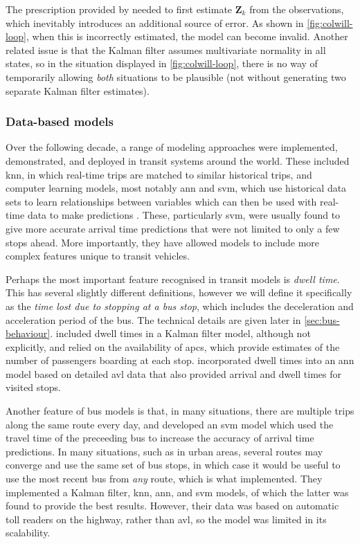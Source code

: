 \documentclass[12pt,a4paper]{article}
\newcommand{\mat}[1]{\mathbf{#1}}
\newcommand{\kf}{Kalman filter}
\begin{document}
The prescription provided by \cite{cathey-dailey:2003} needed to first
estimate $\mat{Z}_k$ from the observations,
which inevitably introduces an additional source of error.
As shown in \cref{fig:colwill-loop}, when this is incorrectly estimated,
the model can become invalid.
Another related issue is that the \kf{} assumes multivariate normality
in all states, so in the situation displayed in \cref{fig:colwill-loop},
there is no way of temporarily allowing \emph{both} situations to be plausible
(not without generating two separate \kf{} estimates).



\subsubsection{Data-based models}
\label{sec:data-models}

Over the following decade, a range of modeling approaches were implemented, demonstrated,
and deployed in transit systems around the world.
These included \gls{knn}, in which real-time trips are matched to similar historical trips,
and computer learning models, most notably \gls{ann} and \gls{svm},
which use historical data sets to learn relationships between variables
which can then be used with real-time data to make predictions
\citep{park-rilett:1999,jeong-rilett:2005,yu-etal:2006,yu-etal:2010,yu-etal:2011}.
These, particularly \gls{svm}, were usually found to give more accurate arrival time
predictions that were not limited to only a few stops ahead.
More importantly, they have allowed models to include more complex features
unique to transit vehicles.


Perhaps the most important feature recognised in transit models is \emph{dwell time}.
This has several slightly different definitions,
however we will define it specifically as the \emph{time lost due to stopping at a bus stop},
which includes the deceleration and acceleration period of the bus.
The technical details are given later in \cref{sec:bus-behaviour}.
\cite{shalaby-farhan:2004} included dwell times in a \kf{} model,
although not explicitly,
and relied on the availability of \glspl{apc},
which provide estimates of the number of passengers boarding at each stop.
\cite{jeong-rilett:2005}
incorporated dwell times into an \gls{ann} model based on detailed \gls{avl} data
that also provided arrival and dwell times for visited stops.


Another feature of bus models is that, in many situations,
there are multiple trips along the same route every day,
and \cite{yu-etal:2006} developed an \gls{svm} model which used the travel time
of the preceeding bus to increase the accuracy of arrival time predictions.
In many situations, such as in urban areas,
several routes may converge and use the same set of bus stops,
in which case it would be useful to use the most recent bus from \emph{any} route,
which is what \cite{yu-etal:2011} implemented.
They implemented a \kf{}, \gls{knn}, \gls{ann}, and \gls{svm} models,
of which the latter was found to provide the best results.
However, their data was based on automatic toll readers on the highway,
rather than \gls{avl},
so the model was limited in its scalability.
\end{document}
